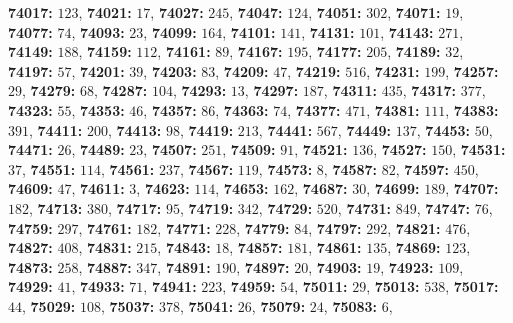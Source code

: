 \textsf{\bfseries 74017:} $123$, \textsf{\bfseries 74021:} $17$, \textsf{\bfseries 74027:} $245$, \textsf{\bfseries 74047:} $124$, \textsf{\bfseries 74051:} $302$, \textsf{\bfseries 74071:} $19$, \textsf{\bfseries 74077:} $74$, \textsf{\bfseries 74093:} $23$, \textsf{\bfseries 74099:} $164$, \textsf{\bfseries 74101:} $141$, \textsf{\bfseries 74131:} $101$, \textsf{\bfseries 74143:} $271$, \textsf{\bfseries 74149:} $188$, \textsf{\bfseries 74159:} $112$, \textsf{\bfseries 74161:} $89$, \textsf{\bfseries 74167:} $195$, \textsf{\bfseries 74177:} $205$, \textsf{\bfseries 74189:} $32$, \textsf{\bfseries 74197:} $57$, \textsf{\bfseries 74201:} $39$, \textsf{\bfseries 74203:} $83$, \textsf{\bfseries 74209:} $47$, \textsf{\bfseries 74219:} $516$, \textsf{\bfseries 74231:} $199$, \textsf{\bfseries 74257:} $29$, \textsf{\bfseries 74279:} $68$, \textsf{\bfseries 74287:} $104$, \textsf{\bfseries 74293:} $13$, \textsf{\bfseries 74297:} $187$, \textsf{\bfseries 74311:} $435$, \textsf{\bfseries 74317:} $377$, \textsf{\bfseries 74323:} $55$, \textsf{\bfseries 74353:} $46$, \textsf{\bfseries 74357:} $86$, \textsf{\bfseries 74363:} $74$, \textsf{\bfseries 74377:} $471$, \textsf{\bfseries 74381:} $111$, \textsf{\bfseries 74383:} $391$, \textsf{\bfseries 74411:} $200$, \textsf{\bfseries 74413:} $98$, \textsf{\bfseries 74419:} $213$, \textsf{\bfseries 74441:} $567$, \textsf{\bfseries 74449:} $137$, \textsf{\bfseries 74453:} $50$, \textsf{\bfseries 74471:} $26$, \textsf{\bfseries 74489:} $23$, \textsf{\bfseries 74507:} $251$, \textsf{\bfseries 74509:} $91$, \textsf{\bfseries 74521:} $136$, \textsf{\bfseries 74527:} $150$, \textsf{\bfseries 74531:} $37$, \textsf{\bfseries 74551:} $114$, \textsf{\bfseries 74561:} $237$, \textsf{\bfseries 74567:} $119$, \textsf{\bfseries 74573:} $8$, \textsf{\bfseries 74587:} $82$, \textsf{\bfseries 74597:} $450$, \textsf{\bfseries 74609:} $47$, \textsf{\bfseries 74611:} $3$, \textsf{\bfseries 74623:} $114$, \textsf{\bfseries 74653:} $162$, \textsf{\bfseries 74687:} $30$, \textsf{\bfseries 74699:} $189$, \textsf{\bfseries 74707:} $182$, \textsf{\bfseries 74713:} $380$, \textsf{\bfseries 74717:} $95$, \textsf{\bfseries 74719:} $342$, \textsf{\bfseries 74729:} $520$, \textsf{\bfseries 74731:} $849$, \textsf{\bfseries 74747:} $76$, \textsf{\bfseries 74759:} $297$, \textsf{\bfseries 74761:} $182$, \textsf{\bfseries 74771:} $228$, \textsf{\bfseries 74779:} $84$, \textsf{\bfseries 74797:} $292$, \textsf{\bfseries 74821:} $476$, \textsf{\bfseries 74827:} $408$, \textsf{\bfseries 74831:} $215$, \textsf{\bfseries 74843:} $18$, \textsf{\bfseries 74857:} $181$, \textsf{\bfseries 74861:} $135$, \textsf{\bfseries 74869:} $123$, \textsf{\bfseries 74873:} $258$, \textsf{\bfseries 74887:} $347$, \textsf{\bfseries 74891:} $190$, \textsf{\bfseries 74897:} $20$, \textsf{\bfseries 74903:} $19$, \textsf{\bfseries 74923:} $109$, \textsf{\bfseries 74929:} $41$, \textsf{\bfseries 74933:} $71$, \textsf{\bfseries 74941:} $223$, \textsf{\bfseries 74959:} $54$, \textsf{\bfseries 75011:} $29$, \textsf{\bfseries 75013:} $538$, \textsf{\bfseries 75017:} $44$, \textsf{\bfseries 75029:} $108$, \textsf{\bfseries 75037:} $378$, \textsf{\bfseries 75041:} $26$, \textsf{\bfseries 75079:} $24$, \textsf{\bfseries 75083:} $6$, 
